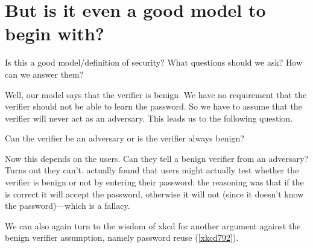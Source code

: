 \section{But is it even a good model to begin with?}

\begin{frame}
  \begin{exercise}
    Is this a good model/definition of security?
    What questions should we ask?
    How can we answer them?
  \end{exercise}

\end{frame}

Well, our model says that the verifier is benign.
We have no requirement that the verifier should not be able to learn the 
password.
So we have to assume that the verifier will never act as an adversary.
This leads us to the following question.

\begin{frame}
  \begin{question}
    Can the verifier be an adversary or is the verifier always benign?
  \end{question}
\end{frame}

Now this depends on the users.
Can they tell a benign verifier from an adversary?
Turns out they can't\autocite{WhyPhishingWorks}.
 actually found that users might actually test 
whether the verifier is benign or not by entering their password:
the reasoning was that if the is correct it will accept the password, otherwise 
it will not (since it doesn't know the password)---which is a fallacy.

We can also again turn to the wisdom of xkcd for another argument against the 
benign verifier assumption, namely password reuse (\cref{xkcd792}).

